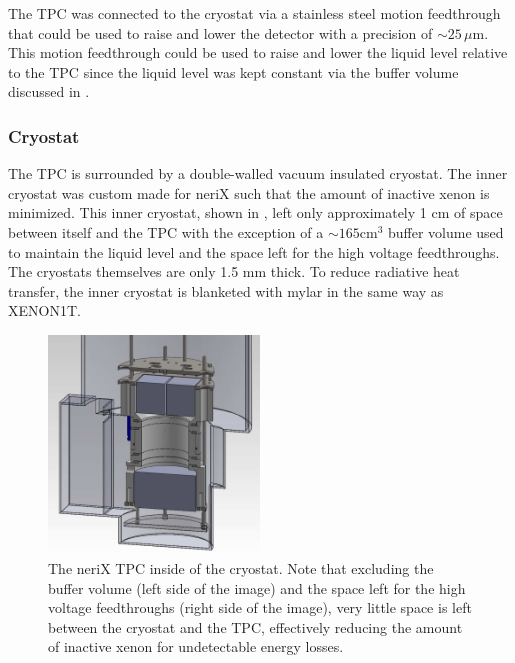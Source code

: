The TPC was connected to the cryostat via a stainless steel motion feedthrough that could be used to raise and lower the detector with a precision of $\sim 25 \, \mu$m.  This motion feedthrough could be used to raise and lower the liquid level relative to the TPC since the liquid level was kept constant via the buffer volume discussed in .



\subsubsection{Cryostat}
\label{sec:nerix_cryostat}

The TPC is surrounded by a double-walled vacuum insulated cryostat.  The inner cryostat was custom made for neriX such that the amount of inactive xenon is minimized.  This inner cryostat, shown in , left only approximately 1 cm of space between itself and the TPC with the exception of a $\sim 165 \textrm{cm}^3$ buffer volume used to maintain the liquid level and the space left for the high voltage feedthroughs.   The cryostats themselves are only 1.5 mm thick.  To reduce radiative heat transfer, the inner cryostat is blanketed with mylar in the same way as XENON1T.


\begin{figure}[t]
        \centering
	\includegraphics[width=0.5\textwidth]{nerix_cryostat_tpc}
	\caption{The neriX TPC inside of the cryostat.  Note that excluding the buffer volume (left side of the image) and the space left for the high voltage feedthroughs (right side of the image), very little space is left between the cryostat and the TPC, effectively reducing the amount of inactive xenon for undetectable energy losses.}
	\label{fig:nerix_cryostat_tpc}
\end{figure}


